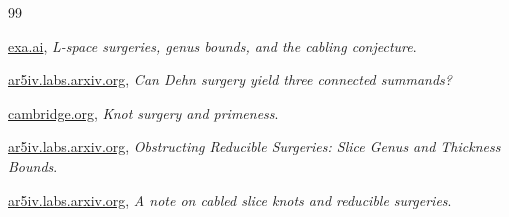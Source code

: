 \documentclass{article}
\theoremstyle{definition}
\begin{document}
\begin{thebibliography}{99}

\href{https://exa.ai/library/publication/zl1m8jt741b}{exa.ai},
\emph{L-space surgeries, genus bounds, and the cabling conjecture}.

\href{https://ar5iv.labs.arxiv.org/html/0908.2697}{ar5iv.labs.arxiv.org},
\emph{Can Dehn surgery yield three connected summands?}

\href{https://www.cambridge.org/core/journals/mathematical-proceedings-of-the-cambridge-philosophical-society/article/abs/knot-surgery-and-primeness/29D04C8E36EF794942FA2F0925BE1775}{cambridge.org},
\emph{Knot surgery and primeness}.

\href{https://ar5iv.labs.arxiv.org/html/2209.01672}{ar5iv.labs.arxiv.org},
\emph{Obstructing Reducible Surgeries: Slice Genus and Thickness Bounds}.

\href{https://ar5iv.labs.arxiv.org/html/1507.04562}{ar5iv.labs.arxiv.org},
\emph{A note on cabled slice knots and reducible surgeries}.

\end{thebibliography}

\end{document}

